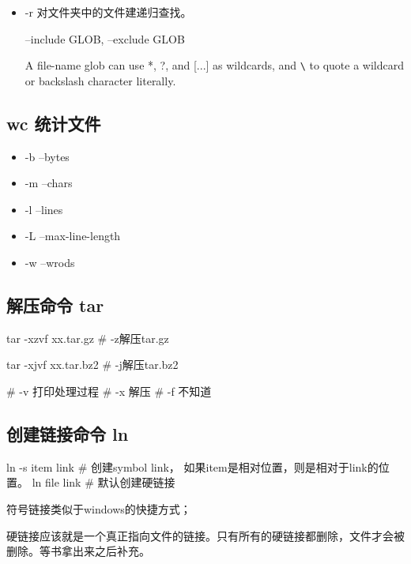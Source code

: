 \begin{itemize}

\item -r 对文件夹中的文件建递归查找。

--include GLOB, --exclude GLOB

A file-name  glob  can  use  *,  ?,  and  [...]   as wildcards,  and  \lstinline$\$  to  quote  a wildcard or backslash character literally.


\end{itemize}

\subsection{wc 统计文件}

\begin{itemize}
\item -b --bytes
\item -m --chars
\item -l --lines
\item -L --max-line-length
\item -w --wrods
\end{itemize}

\subsection{解压命令 tar}

\begin{Bash}
tar -xzvf xx.tar.gz # -z解压tar.gz

tar -xjvf xx.tar.bz2 # -j解压tar.bz2

# -v 打印处理过程
# -x 解压
# -f 不知道
\end{Bash}




\subsection{创建链接命令 ln}

\begin{Bash}
ln -s item link # 创建symbol link， 如果item是相对位置，则是相对于link的位置。
ln file link # 默认创建硬链接
\end{Bash}


符号链接类似于windows的快捷方式；


硬链接应该就是一个真正指向文件的链接。只有所有的硬链接都删除，文件才会被删除。等书拿出来之后补充。

\begin{Bash}

\end{Bash}

